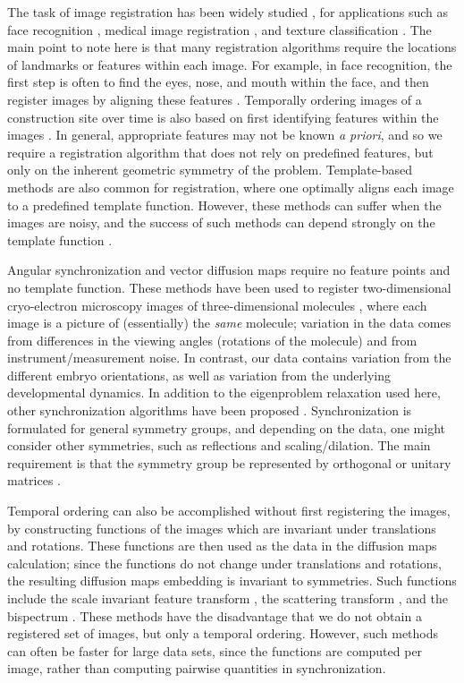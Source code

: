 \documentclass{pnastwo}
\begin{document}
\begin{article}
The task of image registration has been widely studied \cite{zitova2003image}, for applications such as face recognition \cite{rowley1998rotation}, medical image registration \cite{hajnal2010medical}, and texture classification \cite{greenspan1994rotation}.
%
The main point to note here is that many registration algorithms require the locations of landmarks or features within each image.
%
For example, in face recognition, the first step is often to find the eyes, nose, and mouth within the face, and then register images by aligning these features \cite{zhao2003face}.
%
Temporally ordering images of a construction site over time is also based on first identifying features within the images \cite{schindler2007inferring}.
%
In general, appropriate features may not be known {\em a priori}, and so we require a registration algorithm that does not rely on predefined features, but only on the inherent geometric symmetry of the problem.
%
Template-based methods are also common for registration, where one optimally aligns each image to a predefined template function.
%
However, these methods can suffer when the images are noisy, and the success of such methods can depend strongly on the template function \cite{shatsky2009method}.

Angular synchronization and vector diffusion maps require no feature points and no template function.
%
These methods have been used to register two-dimensional cryo-electron microscopy images of three-dimensional molecules \cite{singer2011three}, where each image is a picture of (essentially) the {\em same} molecule; variation in the data comes from differences in the viewing angles (rotations of the molecule) and from instrument/measurement noise.
%
In contrast, our data contains variation from the different embryo orientations, as well as variation from the underlying developmental dynamics. %
%
In addition to the eigenproblem relaxation used here, other synchronization algorithms have been proposed \cite{bandeira2014multireference}.
%
Synchronization is formulated for general symmetry groups, and depending on the data, one might consider other symmetries, such as reflections and scaling/dilation.
%
The main requirement is that the symmetry group be represented by orthogonal or unitary matrices \cite{singer2013spectral}.

Temporal ordering can also be accomplished without first registering the images, by constructing functions of the images which are invariant under translations and rotations. 
%
These functions are then used as the data in the diffusion maps calculation; since the functions do not change under translations and rotations, the resulting diffusion maps embedding is invariant to symmetries.
%
Such functions include the scale invariant feature transform \cite{lowe1999object, lowe2004distinctive}, the scattering transform \cite{mallat2012group}, and the bispectrum \cite{zhao2014rotationally}.
%
These methods have the disadvantage that we do not obtain a registered set of images, but only a temporal ordering.
%
However, such methods can often be faster for large data sets, since the functions are computed per image, rather than computing pairwise quantities in synchronization.


\end{article}
\end{document}
